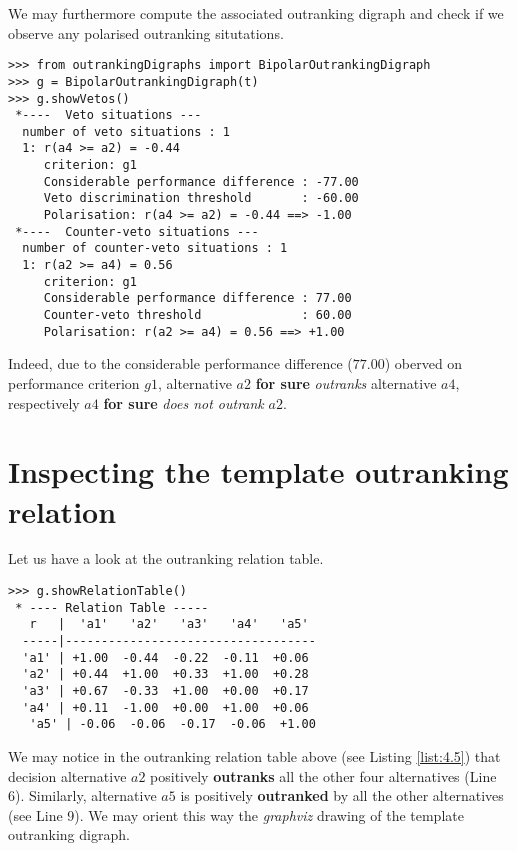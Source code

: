 We may furthermore compute the associated outranking digraph and check if we observe any polarised outranking situtations.

\begin{lstlisting}[basicstyle=\footnotesize]
>>> from outrankingDigraphs import BipolarOutrankingDigraph
>>> g = BipolarOutrankingDigraph(t)
>>> g.showVetos()
 *----  Veto situations ---
  number of veto situations : 1 
  1: r(a4 >= a2) = -0.44
     criterion: g1
     Considerable performance difference : -77.00
     Veto discrimination threshold       : -60.00
     Polarisation: r(a4 >= a2) = -0.44 ==> -1.00
 *----  Counter-veto situations ---
  number of counter-veto situations : 1 
  1: r(a2 >= a4) = 0.56
     criterion: g1
     Considerable performance difference : 77.00
     Counter-veto threshold              : 60.00
     Polarisation: r(a2 >= a4) = 0.56 ==> +1.00
\end{lstlisting}

Indeed, due to the considerable performance difference ($77.00$) oberved on performance criterion $g1$, alternative $a2$ \textbf{for sure} \emph{outranks} alternative $a4$, respectively $a4$ \textbf{for sure} \emph{does not outrank} $a2$.

\section{Inspecting the template outranking relation}
\label{sec:4.6}

Let us have a look at the outranking relation table.

\begin{lstlisting}[caption={The template outranking relation},label=list:4.5,basicstyle=\footnotesize]
>>> g.showRelationTable()
 * ---- Relation Table -----
   r   |  'a1'   'a2'   'a3'   'a4'   'a5'   
  -----|-----------------------------------
  'a1' | +1.00  -0.44  -0.22  -0.11  +0.06  
  'a2' | +0.44  +1.00  +0.33  +1.00  +0.28  
  'a3' | +0.67  -0.33  +1.00  +0.00  +0.17  
  'a4' | +0.11  -1.00  +0.00  +1.00  +0.06  
   'a5' | -0.06  -0.06  -0.17  -0.06  +1.00
\end{lstlisting}

We may notice in the outranking relation table above (see Listing \ref{list:4.5}) that decision alternative $a2$ positively \textbf{outranks} all the other four alternatives  (Line 6). Similarly, alternative $a5$ is positively \textbf{outranked} by all the other alternatives (see Line 9). We may orient this way the \emph{graphviz} drawing of the template outranking digraph. 

